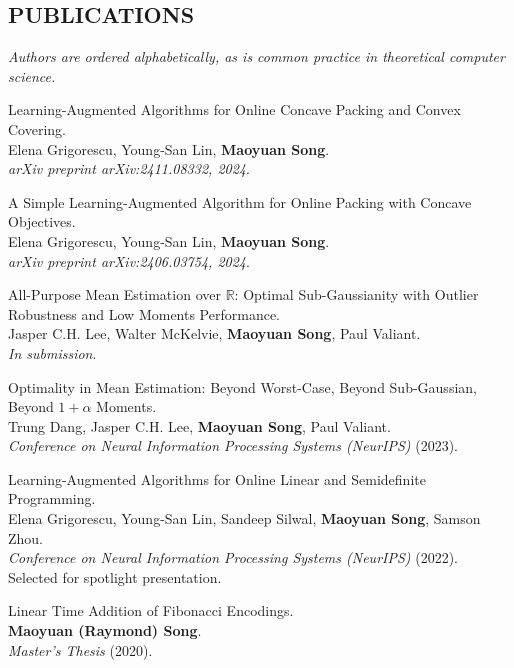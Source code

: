 \documentclass[margin, 10pt]{res} %
\begin{document}
\begin{resume}
\section{PUBLICATIONS}
{\it Authors are ordered alphabetically, as is common practice in theoretical computer science.}
\begin{etaremune}
\item Learning-Augmented Algorithms for Online Concave Packing and Convex Covering.\\
Elena Grigorescu, Young-San Lin, {\bf Maoyuan Song}.\\
\emph{arXiv preprint arXiv:2411.08332, 2024}.
\item A Simple Learning-Augmented Algorithm for Online Packing with Concave Objectives.\\
Elena Grigorescu, Young-San Lin, {\bf Maoyuan Song}.\\
\emph{arXiv preprint arXiv:2406.03754, 2024}.
\item All-Purpose Mean Estimation over $\mathbb{R}$: Optimal Sub-Gaussianity with Outlier Robustness and Low Moments Performance.\\
Jasper C.H. Lee, Walter McKelvie, {\bf Maoyuan Song}, Paul Valiant.\\
\emph{In submission}.
\item Optimality in Mean Estimation: Beyond Worst-Case, Beyond Sub-Gaussian, Beyond $1 + \alpha$ Moments.\\
Trung Dang, Jasper C.H. Lee, {\bf Maoyuan Song}, Paul Valiant.\\
\emph{Conference on Neural Information Processing Systems (NeurIPS)} (2023).
\item Learning-Augmented Algorithms for Online Linear and Semidefinite Programming.\\
Elena Grigorescu, Young-San Lin, Sandeep Silwal, {\bf Maoyuan Song}, Samson Zhou.\\
\emph{Conference on Neural Information Processing Systems (NeurIPS)} (2022). Selected for spotlight presentation.
\item Linear Time Addition of Fibonacci Encodings.\\
{\bf Maoyuan (Raymond) Song}.\\
\emph{Master's Thesis} (2020). 
\end{etaremune}


\end{resume}
\end{document}
